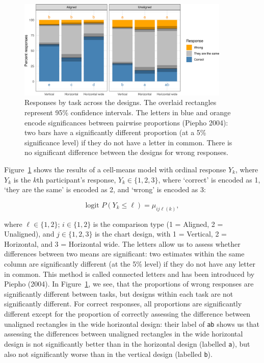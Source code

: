 \documentclass[
]{jds}
\begin{document}
\begin{figure}[hbt]

{\centering \includegraphics[width=0.9\textwidth,height=\textheight]{./figures/fig-response-123-1.png}

}

\caption{\label{fig-response-123}Responses by task across the designs.
The overlaid rectangles represent 95\% confidence intervals. The letters
in blue and orange encode significances between pairwise proportions
(Piepho 2004): two bars have a significantly different proportion (at a
5\% significance level) if they do not have a letter in common. There is
no significant difference between the designs for wrong responses.}

\end{figure}

Figure~\ref{fig-response-123} shows the results of a cell-means model
with ordinal response \(Y_k\), where \(Y_k\) is the \(k\)th
participant's response, \(Y_k \in \{1, 2, 3\}\), where `correct' is
encoded as 1, `they are the same' is encoded as 2, and `wrong' is
encoded as 3:

\begin{equation}
\text{logit }P(Y_k \le \ell) = \mu_{ij\ell(k)},
\end{equation}

where \(\ell \in \{1, 2\}\); \(i \in \{1, 2\}\) is the comparison type
(1 = Aligned, 2 = Unaligned), and \(j \in \{1, 2, 3\}\) is the chart
design, with 1 = Vertical, 2 = Horizontal, and 3 = Horizontal wide. The
letters allow us to assess whether differences between two means are
significant: two estimates within the same column are significantly
different (at the 5\% level) if they do not have any letter in common.
This method is called connected letters and has been introduced by
Piepho (2004). In Figure~\ref{fig-response-123}, we see, that the
proportions of wrong responses are significantly different between
tasks, but designs within each task are not significantly different. For
correct responses, all proportions are significantly different except
for the proportion of correctly assessing the difference between
unaligned rectangles in the wide horizontal design: their label of
\texttt{ab} shows us that assessing the differences between unaligned
rectangles in the wide horizontal design is not significantly better
than in the horizontal design (labelled \texttt{a}), but also not
significantly worse than in the vertical design (labelled \texttt{b}).
\end{document}
